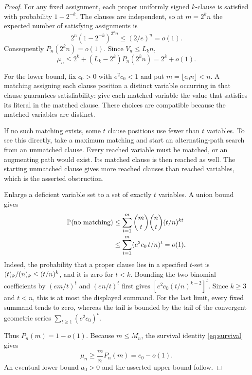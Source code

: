 \begin{proof}
For any fixed assignment, each proper uniformly signed \(k\)-clause
is satisfied with probability \(1-2^{-k}\). The clauses are independent,
so at \(m=2^kn\) the expected number of satisfying assignments is
\[
 2^n(1-2^{-k})^{2^kn}\le(2/e)^n=o(1).
\]
Consequently \(P_n(2^kn)=o(1)\). Since \(V_n\le L_kn\),
\[
 \mu_n\le2^k+(L_k-2^k)P_n(2^kn)=2^k+o(1).
\]

For the lower bound, fix \(c_0>0\) with \(e^2c_0<1\) and put
\(m=\lfloor c_0n\rfloor<n\). A matching assigning each clause position
a distinct variable occurring in that clause guarantees satisfiability:
give each matched variable the value that satisfies its literal in the
matched clause. These choices are compatible because the matched
variables are distinct.

If no such matching exists, some \(t\) clause positions use fewer than
\(t\) variables. To see this directly, take a maximum matching and
start an alternating-path search from an unmatched clause. Every
reached variable must be matched, or an augmenting path would exist.
Its matched clause is then reached as well. The starting unmatched
clause gives more reached clauses than reached variables, which is
the asserted obstruction.

Enlarge a deficient variable set to a set of exactly \(t\) variables.
A union bound gives
\begin{align*}
 \mathbb P(\text{no matching})
 &\le\sum_{t=1}^{m}\binom mt\binom nt(t/n)^{kt}\\
 &\le\sum_{t=1}^{m}(e^2c_0\,t/n)^t=o(1).
\end{align*}
Indeed, the probability that a proper clause lies in a specified
\(t\)-set is \((t)_{k}/(n)_{k}\le(t/n)^k\), and it is zero for
\(t<k\). Bounding the two binomial coefficients by \( (em/t)^t\) and
\((en/t)^t\) first gives \([e^2c_0(t/n)^{k-2}]^t\).
Since \(k\ge3\) and \(t<n\), this is at most the displayed summand.
For the last limit, every fixed summand tends to zero, whereas the tail
is bounded by the tail of the convergent geometric series
\(\sum_{t\ge1}(e^2c_0)^t\).

Thus \(P_n(m)=1-o(1)\). Because \(m\le M_n\), the survival identity
\eqref{eq:survival} gives
\[
 \mu_n\ge\frac mn P_n(m)=c_0-o(1).
\]
An eventual lower bound \(a_0>0\) and the asserted upper bound follow.
\end{proof}
